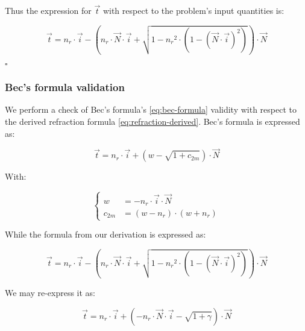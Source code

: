 Thus the expression for $\overrightarrow{t}$ with respect to the problem's input
quantities is:

\begin{equation} \label{eq:refraction-derived}
\overrightarrow{t} = n_r \cdot \overrightarrow{i} -
\left(n_r \cdot \overrightarrow{N} \cdot \overrightarrow{i}
+ \sqrt{1 - {n_r}^2 \cdot \left(1 - 
             \left(\overrightarrow{N} \cdot \overrightarrow{i}\right)^2\right)}
\right)
\cdot \overrightarrow{N}
\end{equation}

$\square$

\subsubsection{Bec's formula validation}
We perform a check of Bec's formula's \cref{eq:bec-formula} validity with
respect to the derived refraction formula \cref{eq:refraction-derived}. Bec's
formula is expressed as:

\begin{equation}
\overrightarrow{t} = n_r \cdot \overrightarrow{i} +
(w - \sqrt{1 + c_{2m}}) \cdot \overrightarrow{N} 
\end{equation}

With:

\begin{equation} \begin{cases}
w &= - n_r \cdot \overrightarrow{i} \cdot \overrightarrow{N} \\
c_{2m} &= (w - n_r) \cdot (w + n_r)
\end{cases} \end{equation}

While the formula from our derivation is expressed as:

\begin{equation}
\overrightarrow{t} = n_r \cdot \overrightarrow{i} -
\left(n_r \cdot \overrightarrow{N} \cdot \overrightarrow{i}
+ \sqrt{1 - {n_r}^2 \cdot \left(1 - 
             \left(\overrightarrow{N} \cdot \overrightarrow{i}\right)^2\right)}
\right)
\cdot \overrightarrow{N}
\end{equation}

We may re-express it as:

\begin{equation}
\overrightarrow{t} = n_r \cdot \overrightarrow{i} +
\left(- n_r \cdot \overrightarrow{N} \cdot \overrightarrow{i}
- \sqrt{1 + \gamma} \right) \cdot \overrightarrow{N}
\end{equation}


